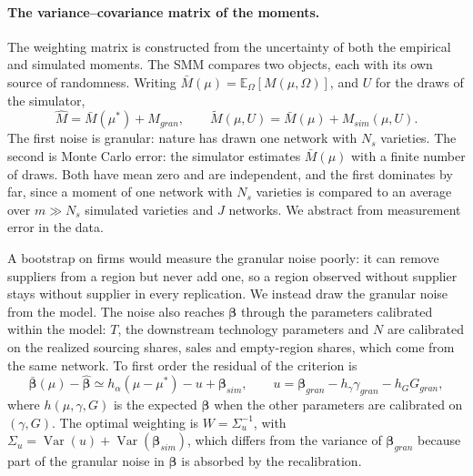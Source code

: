 \paragraph{The variance--covariance matrix of the moments.}
The weighting matrix is constructed from the uncertainty of both the empirical and simulated moments. The SMM compares two objects, each with its own source of randomness. Writing $\bar M(\mu)=\mathbb{E}_\Omega[M(\mu,\Omega)]$, and $U$ for the draws of the simulator,
\begin{equation}
\hat M=\bar M(\mu^*)+M_{gran},\qquad \tilde M(\mu,U)=\bar M(\mu)+M_{sim}(\mu,U).
\end{equation}
The first noise is granular: nature has drawn one network with $N_s$ varieties. The second is Monte Carlo error: the simulator estimates $\bar M(\mu)$ with a finite number of draws. Both have mean zero and are independent, and the first dominates by far, since a moment of one network with $N_s$ varieties is compared to an average over $m\gg N_s$ simulated varieties and $J$ networks. We abstract from measurement error in the data.

A bootstrap on firms would measure the granular noise poorly: it can remove suppliers from a region but never add one, so a region observed without supplier stays without supplier in every replication. We instead draw the granular noise from the model. The noise also reaches $\boldsymbol\beta$ through the parameters calibrated within the model: $T$, the downstream technology parameters and $N$ are calibrated on the realized sourcing shares, sales and empty-region shares, which come from the same network. To first order the residual of the criterion is
\begin{equation}
\bar{\boldsymbol\beta}(\mu)-\hat{\boldsymbol\beta}\simeq h_\alpha(\mu-\mu^*)-u+\boldsymbol\beta_{sim},\qquad u=\boldsymbol\beta_{gran}-h_\gamma\gamma_{gran}-h_GG_{gran},
\end{equation}
where $h(\mu,\gamma,G)$ is the expected $\boldsymbol\beta$ when the other parameters are calibrated on $(\gamma,G)$. The optimal weighting is $W=\Sigma_u^{-1}$, with $\Sigma_u=\operatorname{Var}(u)+\operatorname{Var}(\boldsymbol\beta_{sim})$, which differs from the variance of $\boldsymbol\beta_{gran}$ because part of the granular noise in $\boldsymbol\beta$ is absorbed by the recalibration.

